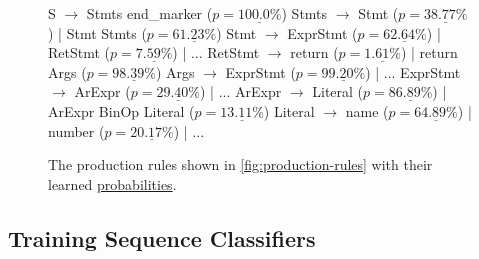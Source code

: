 \begin{figure}[t]
\begin{rules}
S        $\rightarrow$ Stmts end_marker ($p = \underline{100.0\%}$)
Stmts    $\rightarrow$ Stmt \n ($p = \underline{38.77\%}$) | Stmt \n Stmts ($p = \underline{61.23\%}$)
Stmt     $\rightarrow$ ExprStmt ($p = \underline{62.64\%}$) | RetStmt ($p = \underline{ 7.59\%}$) | ...
RetStmt  $\rightarrow$ return ($p = \underline{ 1.61\%}$) | return Args ($p = \underline{98.39\%}$)
Args     $\rightarrow$ ExprStmt ($p = \underline{99.20\%}$) | ...
ExprStmt $\rightarrow$ ArExpr ($p = \underline{29.40\%}$) | ...
ArExpr   $\rightarrow$ Literal ($p = \underline{86.89\%}$) | ArExpr BinOp Literal ($p = \underline{13.11\%}$)
Literal  $\rightarrow$ name ($p = \underline{64.89\%}$) | number ($p = \underline{20.17\%}$) | ...
\end{rules}
\caption{The production rules shown in \autoref{fig:production-rules} with
their learned \underline{probabilities}.}
\label{fig:weighted-production-rules}
\end{figure}

\subsection{Training Sequence Classifiers}
\label{sec:overview:train}

